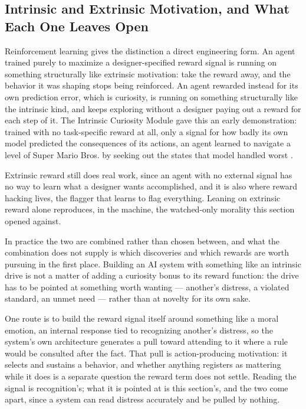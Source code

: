 \subsection{Intrinsic and Extrinsic Motivation, and What Each One Leaves Open}
\label{sec:5.6.1}
Reinforcement learning gives the distinction a direct engineering form. An agent trained purely to maximize a designer-specified reward signal is running on something structurally like extrinsic motivation: take the reward away, and the behavior it was shaping stops being reinforced. An agent rewarded instead for its own prediction error, which is curiosity, is running on something structurally like the intrinsic kind, and keeps exploring without a designer paying out a reward for each step of it. The Intrinsic Curiosity Module gave this an early demonstration: trained with no task-specific reward at all, only a signal for how badly its own model predicted the consequences of its actions, an agent learned to navigate a level of Super Mario Bros. by seeking out the states that model handled worst \autocite{pathak2017curiosity}.

Extrinsic reward still does real work, since an agent with no external signal has no way to learn what a designer wants accomplished, and it is also where reward hacking lives, the flagger that learns to flag everything. Leaning on extrinsic reward alone reproduces, in the machine, the watched-only morality this section opened against.

In practice the two are combined rather than chosen between, and what the combination does not supply is which discoveries and which rewards are worth pursuing in the first place. Building an AI system with something like an intrinsic drive is not a matter of adding a curiosity bonus to its reward function: the drive has to be pointed at something worth wanting — another's distress, a violated standard, an unmet need — rather than at novelty for its own sake.

One route is to build the reward signal itself around something like a moral emotion, an internal response tied to recognizing another's distress, so the system's own architecture generates a pull toward attending to it where a rule would be consulted after the fact. That pull is action-producing motivation: it selects and sustains a behavior, and whether anything registers as mattering while it does is a separate question the reward term does not settle. Reading the signal is recognition's; what it is pointed at is this section's, and the two come apart, since a system can read distress accurately and be pulled by nothing.


